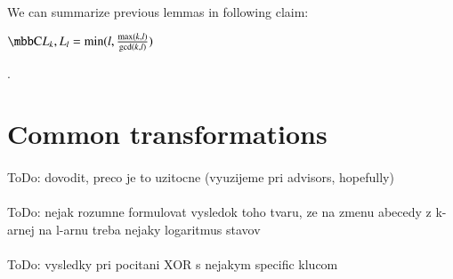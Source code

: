 \paragraph{}
\cveta We can summarize previous lemmas in following claim: \\
\centerline{$\C{L_k, L_l} = \min (l, \frac{\max (k,l)}{\gcd (k,l)})$}.

\section{Common transformations}

\paragraph{}
\color{red}ToDo: dovodit, preco je to uzitocne (vyuzijeme pri advisors, hopefully)\color{black}

\paragraph{}
\color{magenta}ToDo: nejak rozumne formulovat vysledok toho tvaru, ze na zmenu abecedy z k-arnej na l-arnu treba nejaky logaritmus stavov\color{black}

\paragraph{}
\color{magenta}ToDo: vysledky pri pocitani XOR s nejakym specific klucom\color{black}
